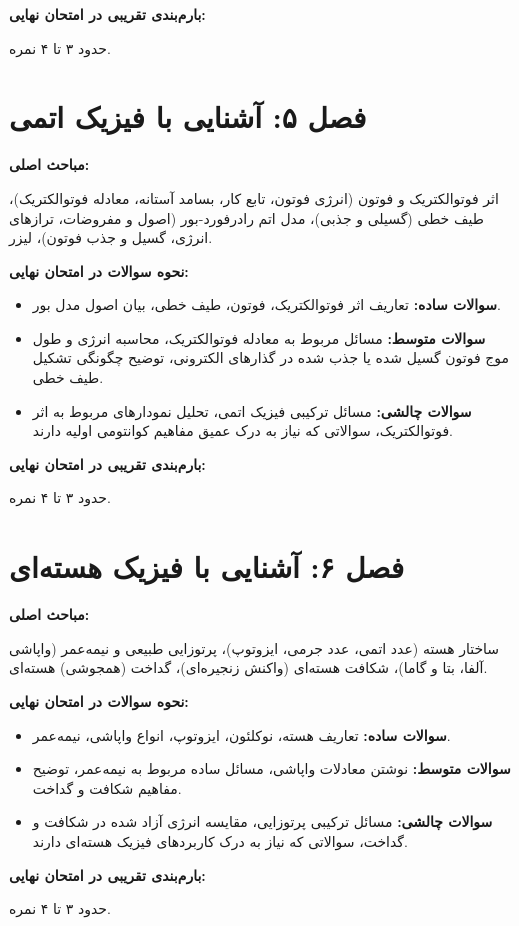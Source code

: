 \documentclass[12pt]{article}
\newcommand{\parahead}[1]{\par\vspace{0.5ex}\noindent\textbf{#1}\par\nopagebreak[4]\vspace{0.5ex}}
\begin{document}
\parahead{بارم‌بندی تقریبی در امتحان نهایی:}
حدود ۳ تا ۴ نمره.

\section{فصل ۵: آشنایی با فیزیک اتمی}

\parahead{مباحث اصلی:}
اثر فوتوالکتریک و فوتون (انرژی فوتون، تابع کار، بسامد آستانه، معادله فوتوالکتریک)، طیف خطی (گسیلی و جذبی)، مدل اتم رادرفورد-بور (اصول و مفروضات، ترازهای انرژی، گسیل و جذب فوتون)، لیزر.

\parahead{نحوه سوالات در امتحان نهایی:}
\begin{itemize}
    \item \textbf{سوالات ساده:} تعاریف اثر فوتوالکتریک، فوتون، طیف خطی، بیان اصول مدل بور.
    \item \textbf{سوالات متوسط:} مسائل مربوط به معادله فوتوالکتریک، محاسبه انرژی و طول موج فوتون گسیل شده یا جذب شده در گذارهای الکترونی، توضیح چگونگی تشکیل طیف خطی.
    \item \textbf{سوالات چالشی:} مسائل ترکیبی فیزیک اتمی، تحلیل نمودارهای مربوط به اثر فوتوالکتریک، سوالاتی که نیاز به درک عمیق مفاهیم کوانتومی اولیه دارند.
\end{itemize}

\parahead{بارم‌بندی تقریبی در امتحان نهایی:}
حدود ۳ تا ۴ نمره.

\section{فصل ۶: آشنایی با فیزیک هسته‌ای}

\parahead{مباحث اصلی:}
ساختار هسته (عدد اتمی، عدد جرمی، ایزوتوپ)، پرتوزایی طبیعی و نیمه‌عمر (واپاشی آلفا، بتا و گاما)، شکافت هسته‌ای (واکنش زنجیره‌ای)، گداخت (همجوشی) هسته‌ای.

\parahead{نحوه سوالات در امتحان نهایی:}
\begin{itemize}
    \item \textbf{سوالات ساده:} تعاریف هسته، نوکلئون، ایزوتوپ، انواع واپاشی، نیمه‌عمر.
    \item \textbf{سوالات متوسط:} نوشتن معادلات واپاشی، مسائل ساده مربوط به نیمه‌عمر، توضیح مفاهیم شکافت و گداخت.
    \item \textbf{سوالات چالشی:} مسائل ترکیبی پرتوزایی، مقایسه انرژی آزاد شده در شکافت و گداخت، سوالاتی که نیاز به درک کاربردهای فیزیک هسته‌ای دارند.
\end{itemize}

\parahead{بارم‌بندی تقریبی در امتحان نهایی:}
حدود ۳ تا ۴ نمره.
\end{document}
